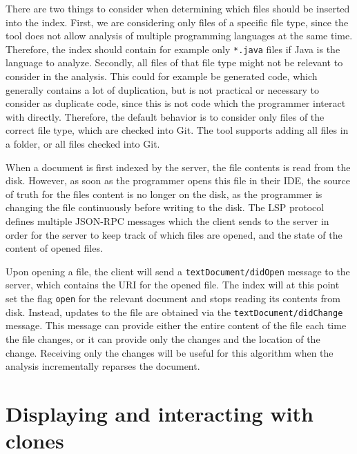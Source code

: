There are two things to consider when determining which files should be inserted into the
index. First, we are considering only files of a specific file type, since the tool does
not allow analysis of multiple programming languages at the same time. Therefore, the
index should contain for example only \verb|*.java| files if Java is the language to
analyze. Secondly, all files of that file type might not be relevant to consider in the
analysis. This could for example be generated code, which generally contains a lot of
duplication, but is not practical or necessary to consider as duplicate code, since this
is not code which the programmer interact with directly. Therefore, the default behavior
is to consider only files of the correct file type, which are checked into Git. The tool
supports adding all files in a folder, or all files checked into Git.

When a document is first indexed by the server, the file contents is read from the disk.
However, as soon as the programmer opens this file in their IDE, the source of truth for
the files content is no longer on the disk, as the programmer is changing the file
continuously before writing to the disk. The LSP protocol defines multiple JSON-RPC
messages which the client sends to the server in order for the server to keep track of
which files are opened, and the state of the content of opened files.

Upon opening a file, the client will send a \verb|textDocument/didOpen| message to the
server, which contains the URI for the opened file. The index will at this point set the
flag \verb|open| for the relevant document and stops reading its contents from disk.
Instead, updates to the file are obtained via the \verb|textDocument/didChange| message.
This message can provide either the entire content of the file each time the file changes,
or it can provide only the changes and the location of the change. Receiving only the
changes will be useful for this algorithm when the analysis incrementally reparses the
document.

\section{Displaying and interacting with clones}

